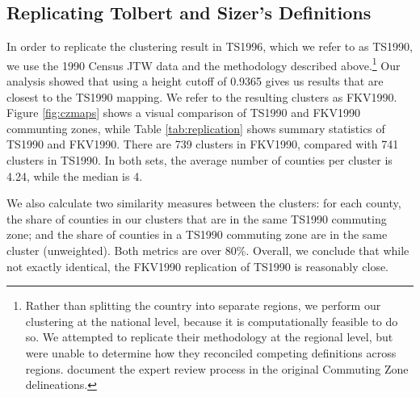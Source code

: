 \subsection{Replicating Tolbert and Sizer's Definitions}





In order to replicate the clustering result in TS1996, which we refer to as TS1990, we use the 1990 Census JTW data and the methodology described above.\footnote{Rather than splitting the country into separate regions, we perform our clustering at the national level, because it is computationally feasible to do so. We attempted to replicate their methodology at the regional level, but were unable to determine how they reconciled competing definitions across regions. \cite{FowlerRhubartJensen2016} document the expert review process in the original Commuting Zone delineations.} 
Our analysis showed that using a height cutoff of 0.9365 gives us results that are closest to the TS1990 mapping. We refer to the resulting clusters as FKV1990. Figure \ref{fig:czmaps} shows a visual comparison of TS1990 and FKV1990 communting zones, while Table \ref{tab:replication} shows summary statistics of TS1990 and FKV1990. There are 739 clusters in FKV1990, compared with  741 clusters in TS1990. In both sets, the average number of counties per cluster is 4.24, while the median is 4.

We also calculate two similarity measures between the clusters: for each county, the share of counties in our clusters that are in the same TS1990 commuting zone; and the share of counties in a TS1990 commuting zone are in the same cluster (unweighted). Both metrics are  over 80\%. Overall, we conclude that while not exactly identical, the FKV1990 replication of TS1990 is reasonably close.


